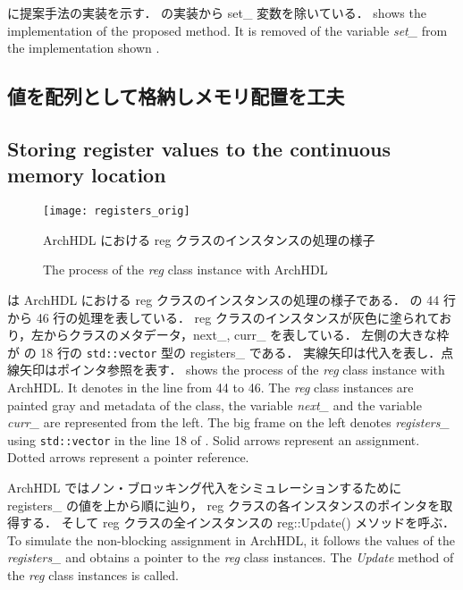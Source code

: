  に提案手法の実装を示す．
 の実装から set\_ 変数を除いている．
\fi
{} shows the implementation of the proposed method.
It is removed of the variable \textit{set\_} from the implementation shown .



\subsection{値を配列として格納しメモリ配置を工夫} \label{sss:mem_copy}
\fi
\subsection{Storing register values to the continuous memory location} \label{sss:mem_copy}

\begin{figure}[t]
 \centering
 \texttt{[image: registers\_orig]}
 \caption{ArchHDL における reg クラスのインスタンスの処理の様子}
\fi
 \caption{The process of the \textit{reg} class instance with ArchHDL}
 \label{fig:regs}
\end{figure}

 は ArchHDL における reg クラスのインスタンスの処理の様子である．
 の 44 行から 46 行の処理を表している．
reg クラスのインスタンスが灰色に塗られており，左からクラスのメタデータ，next\_, curr\_ を表している．
左側の大きな枠が の 18 行の \verb`std::vector` 型の registers\_ である．
実線矢印は代入を表し．点線矢印はポインタ参照を表す．
\fi
{} shows the process of the \textit{reg} class instance with ArchHDL.
It denotes  in the line from 44 to 46.
The \textit{reg} class instances are painted gray
and metadata of the class, the variable \textit{next\_} and the variable \textit{curr\_} are represented from the left.
The big frame on the left denotes \textit{registers\_} using \verb`std::vector` in the line 18 of .
Solid arrows represent an assignment.
Dotted arrows represent a pointer reference.

ArchHDL ではノン・ブロッキング代入をシミュレーションするために registers\_ の値を上から順に辿り，
reg クラスの各インスタンスのポインタを取得する．
そして reg クラスの全インスタンスの reg::Update() メソッドを呼ぶ．
\fi
To simulate the non-blocking assignment in ArchHDL,
it follows the values of the \textit{registers\_}
and obtains a pointer to the \textit{reg} class instances.
The \textit{Update} method of the \textit{reg} class instances is called.

